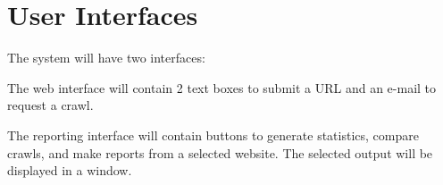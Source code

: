 \section{User Interfaces}
The system will have two interfaces:

The web interface will contain 2 text boxes to submit a URL and an e-mail to request a crawl.

The reporting interface will contain buttons to generate statistics, compare crawls, and make reports from a selected website.  The selected output will be displayed in a window.
